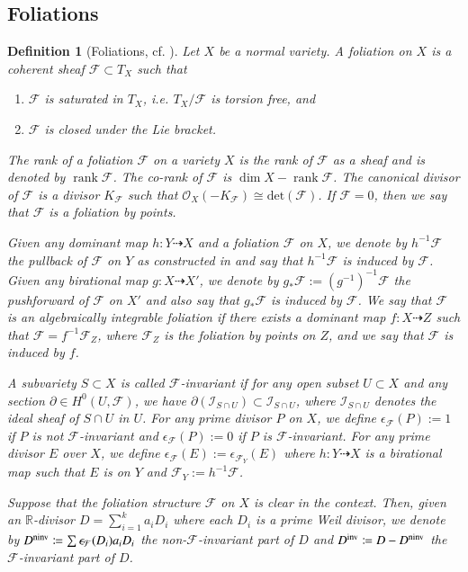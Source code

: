 \documentclass[preprint,12pt]{elsarticle}
\newcommand{\rk}{\operatorname{rank}}
\newcommand{\Ff}{\mathcal{F}}
\newtheorem{defn}[thm]{Definition}
\begin{document}
\subsection{Foliations}

\begin{defn}[Foliations, {cf. \cite{ACSS21,CS21}}]\label{defn: foliation}
Let $X$ be a normal variety. A \emph{foliation} on $X$ is a coherent sheaf $\Ff\subset T_X$ such that
\begin{enumerate}
    \item $\Ff$ is saturated in $T_X$, i.e. $T_X/\Ff$ is torsion free, and
    \item $\Ff$ is closed under the Lie bracket.
\end{enumerate}

The \emph{rank} of a foliation $\Ff$ on a variety $X$ is the rank of $\Ff$ as a sheaf and is denoted by $\rk\Ff$. 
The \emph{co-rank} of $\Ff$ is $\dim X-\rk\Ff$. The \emph{canonical divisor} of $\Ff$ is a divisor $K_\Ff$ such that $\mathcal{O}_X(-K_{\mathcal{F}})\cong\mathrm{det}(\Ff)$. If $\Ff=0$, then we say that $\Ff$ is a \emph{foliation by points}.

Given any dominant map 
$h: Y\dashrightarrow X$ and a foliation $\mathcal F$ on $X$, we denote by $h^{-1}\Ff$ the \emph{pullback} of $\Ff$ on $Y$ as constructed in \cite[3.2]{Dru21} and say that $h^{-1}\Ff$ is \emph{induced by} $\Ff$. Given any birational map $g: X\dashrightarrow X'$, we denote by $g_\ast \Ff:=(g^{-1})^{-1}\Ff$ the \emph{pushforward} of $\Ff$ on $X'$ and also say that $g_\ast \Ff$ is \emph{induced by} $\Ff$. We say that $\Ff$ is an \emph{algebraically integrable foliation} if there exists a dominant map $f: X\dashrightarrow Z$ such that $\Ff=f^{-1}\Ff_Z$, where $\Ff_Z$ is the foliation by points on $Z$, and we say that $\Ff$ is \emph{induced by} $f$.

A subvariety $S\subset X$ is called \emph{$\Ff$-invariant} if for any open subset $U\subset X$ and any section $\partial\in H^0(U,\Ff)$, we have $\partial(\mathcal{I}_{S\cap U})\subset \mathcal{I}_{S\cap U}$,  where $\mathcal{I}_{S\cap U}$ denotes the ideal sheaf of $S\cap U$ in $U$.  
For any prime divisor $P$ on $X$, we define $\epsilon_{\Ff}(P):=1$ if $P$ is not $\Ff$-invariant and $\epsilon_{\Ff}(P):=0$ if $P$ is $\Ff$-invariant. For any prime divisor $E$ over $X$, we define $\epsilon_{\Ff}(E):=\epsilon_{\Ff_Y}(E)$ where $h: Y\dashrightarrow X$ is a birational map such that $E$ is on $Y$ and $\Ff_Y:=h^{-1}\Ff$.

Suppose that the foliation structure $\Ff$ on $X$ is clear in the context. Then, given an $\mathbb R$-divisor $D = \sum_{i = 1}^k a_iD_i$ where each $D_i$ is a prime Weil divisor,
we denote by $D^{{\rm ninv}} \coloneqq \sum \epsilon_{\mathcal F}(D_i)a_iD_i$ the \emph{non-$\Ff$-invariant part} of $D$ and $D^{{\rm inv}} \coloneqq D-D^{{\rm ninv}}$ the \emph{$\Ff$-invariant part} of $D$.
\end{defn}
\end{document}
